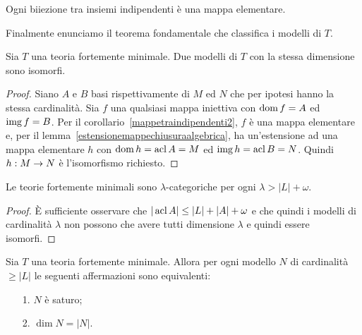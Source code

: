 \begin{corollary}\label{mappetraindipendenti2} 
Ogni biiezione tra insiemi indipendenti \`e una mappa elementare.\QED
\end{corollary}

Finalmente enunciamo il teorema fondamentale che classifica i modelli di $T$.

\begin{theorem}
Sia $T$ una teoria fortemente minimale. Due modelli di $T$ con la stessa dimensione sono isomorfi.
\end{theorem}
\begin{proof}
Siano $A$ e $B$ basi rispettivamente di $M$ ed $N$ che per ipotesi hanno la stessa cardinalit\`a. Sia $f$ una qualsiasi mappa iniettiva con $\mathop{\rm dom} f=A$ ed $\mathop{\rm img} f=B$. Per il corollario~\ref{mappetraindipendenti2}, $f$ \`e una mappa elementare e, per il lemma~\ref{estensionemappechiusuraalgebrica}, ha un'estensione ad una mappa elementare $h$ con $\mathop{\rm dom} h=\mathop{\rm acl} A=M$ ed $\mathop{\rm img} h=\mathop{\rm acl} B=N$. Quindi $h:M\rightarrow N$ \`e l'isomorfismo richiesto.
\end{proof}

\begin{corollary} 
Le teorie fortemente minimali sono $\lambda$-categoriche per ogni $\lambda>|L|+\omega$.
\end{corollary}
\begin{proof}
\`E sufficiente osservare che $|\mathop{\rm acl} A|\le |L|+|A|+\omega$ e che quindi i modelli di cardinalit\`a $\lambda$ non possono che avere tutti dimensione $\lambda$ e quindi essere isomorfi.
\end{proof}

\begin{theorem} 
Sia $T$ una teoria fortemente minimale. Allora per ogni modello $N$ di cardinalit\`a $\ge|L|$ le seguenti affermazioni sono equivalenti:
\begin{itemize}
\item[1.] $N$ \`e saturo;
\item[2.] $\dim N=|N|$.
\end{itemize}
\end{theorem}

